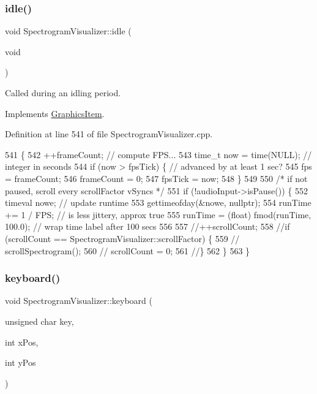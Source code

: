 \subsubsection{\texorpdfstring{idle()}{idle()}}
{\footnotesize\ttfamily void Spectrogram\+Visualizer\+::idle (\begin{DoxyParamCaption}\item[{void}]{ }\end{DoxyParamCaption})\hspace{0.3cm}{\ttfamily [virtual]}}

Called during an idling period. 

Implements \mbox{\hyperlink{classGraphicsItem}{Graphics\+Item}}.



Definition at line 541 of file Spectrogram\+Visualizer.\+cpp.


\begin{DoxyCode}
541                                  \{
542     ++frameCount;        \textcolor{comment}{// compute FPS...}
543     time\_t now = time(NULL);     \textcolor{comment}{// integer in seconds}
544     \textcolor{keywordflow}{if} (now > fpsTick) \{    \textcolor{comment}{// advanced by at least 1 sec?}
545         fps = frameCount;
546         frameCount = 0;
547         fpsTick = now;
548     \}
549 
550     \textcolor{comment}{/* if not paused, scroll every scrollFactor vSyncs */}
551     \textcolor{keywordflow}{if} (!audioInput->isPause()) \{
552         timeval nowe;  \textcolor{comment}{// update runtime}
553         gettimeofday(&nowe, \textcolor{keyword}{nullptr});
554         runTime += 1 / FPS;        \textcolor{comment}{// is less jittery, approx true}
555         runTime = (float) fmod(runTime, 100.0);    \textcolor{comment}{// wrap time label after 100 secs}
556 
557         \textcolor{comment}{//++scrollCount;}
558         \textcolor{comment}{//if (scrollCount == SpectrogramVisualizer::scrollFactor) \{}
559         \textcolor{comment}{//    scrollSpectrogram();}
560         \textcolor{comment}{//    scrollCount = 0;}
561         \textcolor{comment}{//\}}
562     \}
563 \}
\end{DoxyCode}
\mbox{\label{structSpectrogramVisualizer_a2901f4ea1e35d4c7e6660f6c19ed468f}} 
\subsubsection{\texorpdfstring{keyboard()}{keyboard()}}
{\footnotesize\ttfamily void Spectrogram\+Visualizer\+::keyboard (\begin{DoxyParamCaption}\item[{unsigned char}]{key,  }\item[{int}]{x\+Pos,  }\item[{int}]{y\+Pos }\end{DoxyParamCaption})\hspace{0.3cm}{\ttfamily [virtual]}}

